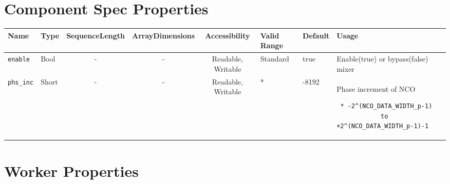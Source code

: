 \documentclass{article}
\begin{document}
\begin{landscape}
	\section*{Component Spec Properties}
	\begin{scriptsize}
		\begin{tabular}{|p{3cm}|p{1.5cm}|c|c|c|p{1.5cm}|p{1cm}|p{7cm}|}
			\hline
			\rowcolor{blue}
			Name               & Type   & SequenceLength & ArrayDimensions & Accessibility      & Valid Range & Default & Usage                                                                         \\
			\hline
			\verb+enable+      & Bool   & -              & -               & Readable, Writable & Standard    & true    & Enable(true) or bypass(false) mixer                                           \\
			\hline
			\verb+phs_inc+     & Short  & -              & -               & Readable, Writable & *           & -8192   & Phase increment of NCO \scriptsize\begin{verbatim} * -2^(NCO_DATA_WIDTH_p-1)
			to +2^(NCO_DATA_WIDTH_p-1)-1\end{verbatim}\\
			\hline

		\end{tabular}
	\end{scriptsize}

	\section*{Worker Properties}

\end{landscape}
\end{document}
